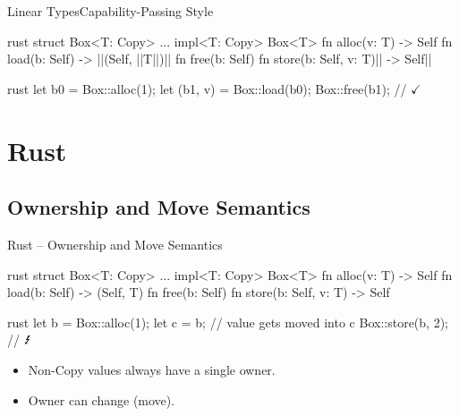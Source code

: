 \documentclass[aspectratio=169,onlytextwidth]{beamer}
\begin{document}
\begin{frame}[fragile]{Linear Types}{Capability-Passing Style}
  \centering

  \begin{lst}{rust}
    struct Box<T: Copy> { ... }
    impl<T: Copy> Box<T> {
      fn alloc(v: T) -> Self {}   fn load(b: Self) -> ||(Self, ||T||)|| {}
      fn free(b: Self) {}         fn store(b: Self, v: T)|| -> Self|| {}
    }
  \end{lst}


  \begin{lst}{rust}
    let b0 = Box::alloc(1);
    let (b1, v) = Box::load(b0);
    Box::free(b1); // $\checkmark$
  \end{lst}

\end{frame}

\section{Rust}

\subsection{Ownership and Move Semantics}

\begin{frame}[fragile]{Rust -- Ownership and Move Semantics}
  \centering

  \begin{lst}{rust}
    struct Box<T: Copy> { ... }
    impl<T: Copy> Box<T> {
      fn alloc(v: T) -> Self {}   fn load(b: Self) -> (Self, T) {}
      fn free(b: Self) {}         fn store(b: Self, v: T) -> Self {}
    }
  \end{lst}

  \begin{lst}{rust}
    let b = Box::alloc(1);
    let c = b; // value gets moved into c
    Box::store(b, 2); // $\text{\Lightning}$
  \end{lst}

  \pause

  \begin{itemize}
    \item Non-Copy values always have a single owner.
    \item Owner can change (move).
  \end{itemize}
\end{frame}
\end{document}
